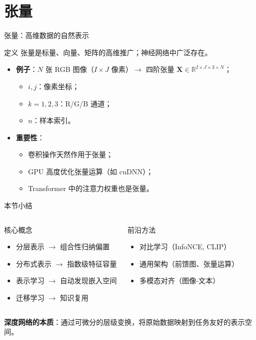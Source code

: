 \documentclass[t,aspectratio=169]{beamer} %
\begin{document}
\section{张量}
\begin{frame}{张量：高维数据的自然表示}
\begin{block}{定义}
    张量是标量、向量、矩阵的高维推广；神经网络中广泛存在。
\end{block}

\begin{itemize}
    \item \textbf{例子}：$N$ 张 RGB 图像（$I \times J$ 像素）$\to$ 四阶张量 $\mathbf{X} \in \mathbb{R}^{I \times J \times 3 \times N}$；
        \begin{itemize}
            \item $i,j$：像素坐标；
            \item $k=1,2,3$：R/G/B 通道；
            \item $n$：样本索引。
        \end{itemize}
    \item \textbf{重要性}：
        \begin{itemize}
            \item 卷积操作天然作用于张量；
            \item GPU 高度优化张量运算（如 cuDNN）；
            \item Transformer 中的注意力权重也是张量。
        \end{itemize}
\end{itemize}
\end{frame}

\begin{frame}{本节小结}
\begin{columns}
\begin{block}{核心概念}
\begin{itemize}
    \item 分层表示 $\to$ 组合性归纳偏置
    \item 分布式表示 $\to$ 指数级特征容量
    \item 表示学习 $\to$ 自动发现嵌入空间
    \item 迁移学习 $\to$ 知识复用
\end{itemize}
\end{block}

\begin{block}{前沿方法}
\begin{itemize}
    \item 对比学习（InfoNCE, CLIP）
    \item 通用架构（前馈图、张量运算）
    \item 多模态对齐（图像-文本）
\end{itemize}
\end{block}
\end{columns}

\vspace{1em}
\centering
\textbf{深度网络的本质}：通过可微分的层级变换，将原始数据映射到任务友好的表示空间。
\end{frame}
\end{document}
